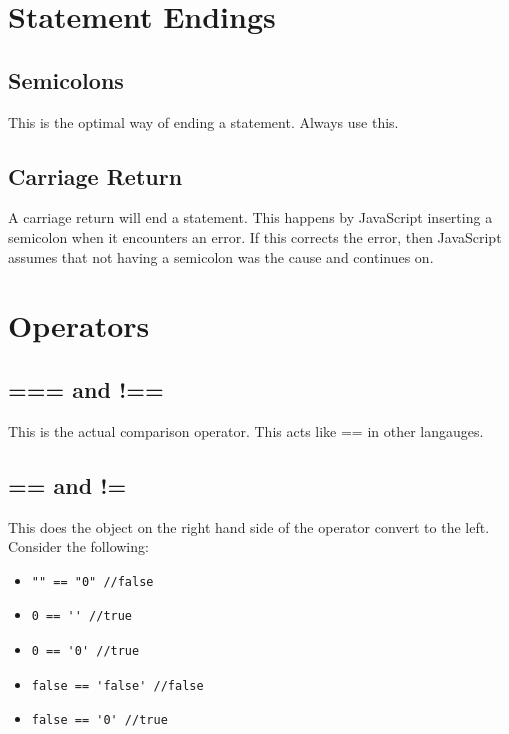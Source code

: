 \documentclass {article}
\begin{document}
\section{Statement Endings}
	\subsection{Semicolons}
		This is the optimal way of ending a statement.  Always use this.
	\subsection {Carriage Return}
		A carriage return will end a statement.  This happens by JavaScript inserting a semicolon when it encounters an error.  If this corrects the error, then JavaScript assumes that not having a semicolon was the cause and continues on. 


\section{Operators}
	\subsection{=== and !==}
		This is the actual comparison operator.  This acts like == in other langauges.
	\subsection{== and !=}
		This does the object on the right hand side of the operator convert to the left.  
		Consider the following: 

		\begin{itemize}
			\item 
\begin{lstlisting} 
"" == "0" //false
\end{lstlisting} 
			\item 
\begin{lstlisting} 
0 == '' //true
\end{lstlisting} 
			\item 
\begin{lstlisting} 
0 == '0' //true
\end{lstlisting} 
		\end{itemize}


		\begin{itemize}
			\item 
\begin{lstlisting} 
false == 'false' //false 
\end{lstlisting}
			\item 
\begin{lstlisting} 
false == '0' //true
\end{lstlisting} 
		\end{itemize}
\end{document}
